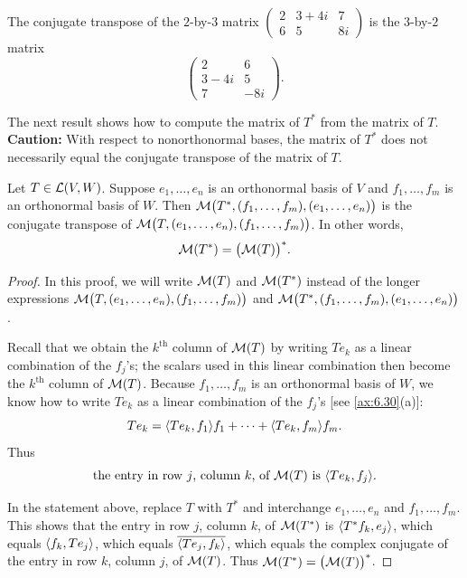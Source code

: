 \begin{example}\label{ax:7.8}
The conjugate transpose of the $2$-by-$3$ matrix
$\begin{pmatrix} 2 & 3+4i & 7\\ 6 & 5 & 8i \end{pmatrix}$
is the $3$-by-$2$ matrix
\[ \begin{pmatrix} 2 & 6\\ 3-4i & 5\\ 7 & -8i \end{pmatrix}. \]
\end{example}

%
%
The next result shows how to compute the matrix of $T^*$ from the matrix of
$T$. \textbf{Caution:} With respect to nonorthonormal bases, the matrix of $T^*$
does not necessarily equal the conjugate transpose of the matrix of $T$.

\begin{result}%
\label{ax:7.9}
Let $T\in\mathcal{L}(V,W)$. Suppose $e_1,\dots,e_n$ is an orthonormal basis of $V$ and
$f_1,\dots,f_m$ is an orthonormal basis of $W$. Then
$\mathcal{M}\bigl(T^*,(f_1,\dots,f_m),(e_1,\dots,e_n)\bigr)$ is the conjugate transpose
of $\mathcal{M}\bigl(T,(e_1,\dots,e_n),(f_1,\dots,f_m)\bigr)$. In other words,
\[ \mathcal{M}(T^*) = \bigl(\mathcal{M}(T)\bigr)^*. \]
\end{result}

\begin{proof}
In this proof, we will write $\mathcal{M}(T)$ and $\mathcal{M}(T^*)$ instead of the longer
expressions $\mathcal{M}\bigl(T,(e_1,\dots,e_n),(f_1,\dots,f_m)\bigr)$ and
$\mathcal{M}\bigl(T^*,(f_1,\dots,f_m),(e_1,\dots,e_n)\bigr)$.

Recall that we obtain the $k^{\text{th}}$ column of $\mathcal{M}(T)$ by writing $Te_k$
as a linear combination of the $f_j$'s; the scalars used in this linear
combination then become the $k^{\text{th}}$ column of $\mathcal{M}(T)$. Because
$f_1,\dots,f_m$ is an orthonormal basis of $W$, we know how to write $Te_k$ as a
linear combination of the $f_j$'s [see \ref{ax:6.30}(a)]:
\[ Te_k = \langle Te_k, f_1 \rangle f_1+\cdots+\langle Te_k, f_m \rangle f_m. \]
Thus
\[ \text{the entry in row $j$, column $k$, of $\mathcal{M}(T)$ is $\langle Te_k, f_j \rangle$.} \]

In the statement above, replace $T$ with $T^*$ and interchange $e_1,\allowbreak\dots,e_n$
and $f_1,\allowbreak\dots,f_m$. This shows that the entry in row $j$, column $k$, of
$\mathcal{M}(T^*)$ is $\langle T^*f_k, e_j \rangle$, which equals $\langle f_k, Te_j \rangle$, which equals
$\overline{\langle Te_j, f_k \rangle}$, which equals the complex conjugate of the entry in
row $k$, column $j$, of $\mathcal{M}(T)$. Thus $\mathcal{M}(T^*)=\bigl(\mathcal{M}(T)\bigr)^*$.
\end{proof}

